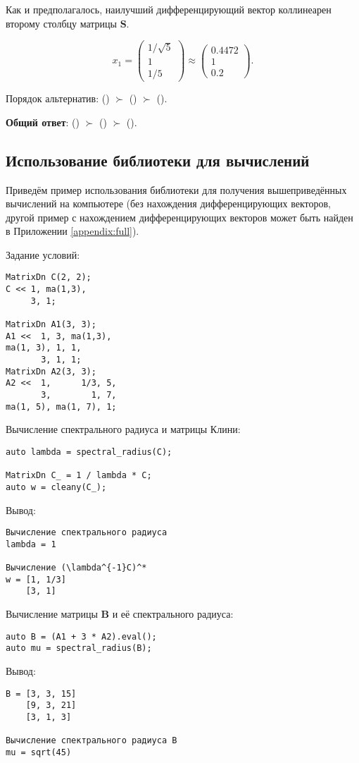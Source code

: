 \documentclass[specialist,
	substylefile = spbu_report.rtx,
	subf,href,colorlinks=true, 12pt]{disser}
\begin{document}
Как и предполагалось, наилучший дифференцирующий вектор коллинеарен второму столбцу матрицы \(\boldsymbol{S}\).

\[
	x_1 = \begin{pmatrix}
		1/\sqrt{5} \\1\\1/5
	\end{pmatrix} \approx \begin{pmatrix}
		0.4472 \\ 1 \\ 0.2
	\end{pmatrix}.
\]

Порядок альтернатив: () \(\succ\) () \(\succ\) ().

\textbf{Общий ответ}: () \(\succ\) () \(\succ\) ().

\subsection{Использование библиотеки для вычислений}
Приведём пример использования библиотеки для получения вышеприведённых вычислений на компьютере (без нахождения дифференцирующих векторов, другой пример с нахождением дифференцирующих векторов может быть найден в Приложении \ref{appendix:full}).

Задание условий:
\begin{verbatim}
MatrixDn C(2, 2);
C << 1, ma(1,3), 
     3, 1;
		
MatrixDn A1(3, 3);
A1 <<  1, 3, ma(1,3), 
ma(1, 3), 1, 1, 
       3, 1, 1;
MatrixDn A2(3, 3);
A2 <<  1,      1/3, 5, 
       3,        1, 7, 
ma(1, 5), ma(1, 7), 1;
\end{verbatim}

Вычисление спектрального радиуса и матрицы Клини:
\begin{verbatim}
auto lambda = spectral_radius(C);

MatrixDn C_ = 1 / lambda * C;
auto w = cleany(C_);
\end{verbatim}
Вывод:
\begin{verbatim}
Вычисление спектрального радиуса
lambda = 1

Вычисление (\lambda^{-1}C)^*
w = [1, 1/3]
	[3, 1]
\end{verbatim}

Вычисление матрицы $\boldsymbol{B}$ и её спектрального радиуса:
\begin{verbatim}
auto B = (A1 + 3 * A2).eval();
auto mu = spectral_radius(B);
\end{verbatim}
Вывод:
\begin{verbatim}
B = [3, 3, 15]
	[9, 3, 21]
	[3, 1, 3]

Вычисление спектрального радиуса B
mu = sqrt(45)
\end{verbatim}
\end{document}
